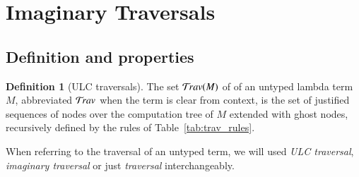 \documentclass{elsarticle}
\theoremstyle{plain}
\theoremstyle{definition}
\newtheorem{definition}{Definition}[section]
\theoremstyle{remark}
\newcommand{\travulc}{\travset}
\begin{document}
\section{Imaginary Traversals}
\label{sec:imaginary_traversals}
\subsection{Definition and properties}

\begin{definition}[ULC traversals]
The set $\travulc(M)$ of  of an untyped lambda term $M$, abbreviated $\travulc$ when the term is clear from context, is the set of justified sequences of nodes over the computation tree of $M$ extended with ghost nodes, recursively defined by the rules of Table~\ref{tab:trav_rules}.
\end{definition}
When referring to the traversal of an untyped term, we will used
\emph{ULC traversal}, \emph{imaginary traversal} or just \emph{traversal} interchangeably.
\end{document}
